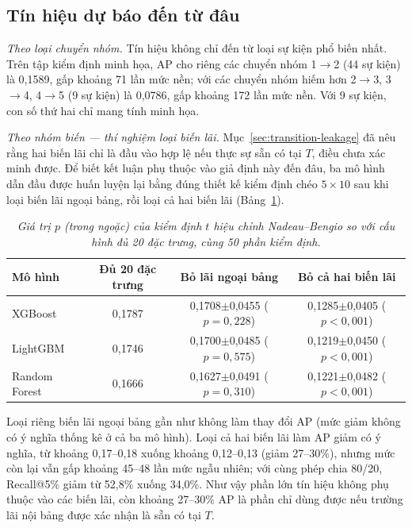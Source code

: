 \subsection{Tín hiệu dự báo đến từ đâu}
\label{sec:transition-signal}

\noindent\textit{Theo loại chuyển nhóm.} Tín hiệu không chỉ đến từ loại sự kiện phổ biến nhất. Trên tập kiểm định minh họa, AP cho riêng các chuyển nhóm 1$\to$2 (44 sự kiện) là 0,1589, gấp khoảng 71 lần mức nền; với các chuyển nhóm hiếm hơn 2$\to$3, 3$\to$4, 4$\to$5 (9 sự kiện) là 0,0786, gấp khoảng 172 lần mức nền. Với 9 sự kiện, con số thứ hai chỉ mang tính minh họa.

\medskip
\noindent\textit{Theo nhóm biến --- thí nghiệm loại biến lãi.} Mục~\ref{sec:transition-leakage} đã nêu rằng hai biến lãi chỉ là đầu vào hợp lệ nếu thực sự sẵn có tại $T$, điều chưa xác minh được. Để biết kết luận phụ thuộc vào giả định này đến đâu, ba mô hình dẫn đầu được huấn luyện lại bằng đúng thiết kế kiểm định chéo $5\times10$ sau khi loại biến lãi ngoại bảng, rồi loại cả hai biến lãi (Bảng~\ref{tab:transition-ablation}).

\begin{table}[H]
\centering
\caption{AP khi loại biến lãi --- kiểm định chéo $5\times10$}
\label{tab:transition-ablation}
\begin{tabular}{|l|c|c|c|}
\hline
Mô hình & Đủ 20 đặc trưng & Bỏ lãi ngoại bảng & Bỏ cả hai biến lãi\\
\hline
XGBoost & 0,1787 & 0,1708$\pm$0,0455 ($p=0,228$) & 0,1285$\pm$0,0405 ($p<0,001$)\\
LightGBM & 0,1746 & 0,1700$\pm$0,0485 ($p=0,575$) & 0,1219$\pm$0,0450 ($p<0,001$)\\
Random Forest & 0,1666 & 0,1627$\pm$0,0491 ($p=0,310$) & 0,1221$\pm$0,0482 ($p<0,001$)\\
\hline
\end{tabular}
\caption*{\textit{Giá trị $p$ (trong ngoặc) của kiểm định $t$ hiệu chỉnh Nadeau--Bengio so với cấu hình đủ 20 đặc trưng, cùng 50 phần kiểm định.}}
\end{table}

Loại riêng biến lãi ngoại bảng gần như không làm thay đổi AP (mức giảm không có ý nghĩa thống kê ở cả ba mô hình). Loại cả hai biến lãi làm AP giảm có ý nghĩa, từ khoảng 0,17--0,18 xuống khoảng 0,12--0,13 (giảm 27--30\%), nhưng mức còn lại vẫn gấp khoảng 45--48 lần mức ngẫu nhiên; với cùng phép chia 80/20, Recall@5\% giảm từ 52,8\% xuống 34,0\%. Như vậy phần lớn tín hiệu không phụ thuộc vào các biến lãi, còn khoảng 27--30\% AP là phần chỉ dùng được nếu trường lãi nội bảng được xác nhận là sẵn có tại $T$.

